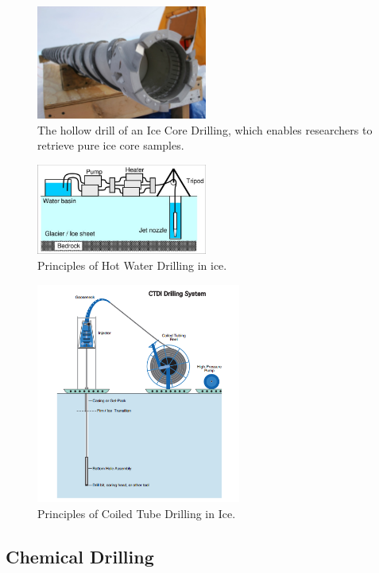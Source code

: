 \begin{figure}[htb]
  \centering
  \includegraphics[width=0.5\textwidth]{figures/mlh/ICD}
  \caption{The hollow drill of an Ice Core Drilling, which enables researchers to retrieve pure ice core samples.}
  \label{fig:ICD}
\end{figure}
\begin{figure}[htb]
  \centering
  \includegraphics[width=0.5\textwidth]{figures/mlh/HWD}
  \caption{Principles of Hot Water Drilling in ice.}
  \label{fig:HWD}
\end{figure}
\begin{figure}[htb]
  \centering
  \includegraphics[width=0.6\textwidth]{figures/mlh/CTDI}
  \caption{Principles of Coiled Tube Drilling in Ice.}
  \label{fig:CTDI}
\end{figure}

\subsection{Chemical Drilling}

